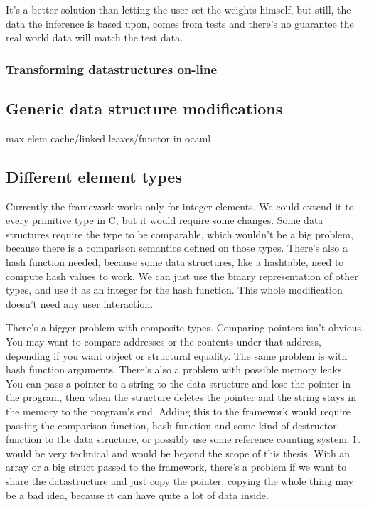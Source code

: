\documentclass[11pt]{article}
\begin{document}
			It's a better solution than letting the user set the weights himself, but still, the data the inference is based upon, comes from tests
			and there's no guarantee the real world data will match the test data.

		\subsubsection{Transforming datastructures on-line}
	\subsection{Generic data structure modifications}

		max elem cache/linked leaves/functor in ocaml
	\subsection{Different element types}
		Currently the framework works only for integer elements. We could extend it to every primitive type in C, but it would require some changes.
		Some data structures require the type to be comparable, which wouldn't be a big problem, because there is a comparison semantics defined on those
		types. There's also a hash function needed, because some data structures, like a hashtable, need to compute hash values to work. We can just use
		the binary representation of other types, and use it as an integer for the hash function. This whole modification doesn't need any user
		interaction.

		There's a bigger problem with composite types. Comparing pointers isn't obvious. You may want to compare addresses or the contents under that
		address, depending if you want object or structural equality. The same problem is with hash function arguments. There's also a problem with
		possible memory leaks. You can pass a pointer to a string to the data structure and lose the pointer in the program, then when the structure
		deletes the pointer and the string stays in the memory to the program's end. Adding this to the framework would require passing the comparison
		function, hash function and some kind of destructor function to the data structure, or possibly use some reference counting system. It would be
		very technical and would be beyond the scope of this thesis. With an array or a big struct passed to the framework, there's a problem if we want
		to share the datastructure and just copy the pointer, copying the whole thing may be a bad idea, because it can have quite a lot of data inside.
\end{document}
